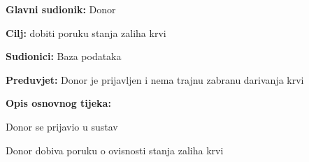 \noindent {}
					\begin{packed_item}
	
						\item \textbf{Glavni sudionik: }Donor
						\item \textbf{Cilj:} dobiti poruku stanja zaliha krvi
						\item \textbf{Sudionici:} Baza podataka
						\item \textbf{Preduvjet:} Donor je prijavljen i nema trajnu zabranu darivanja krvi
						\item \textbf{Opis osnovnog tijeka:}
						
						\item[] \begin{packed_enum}
	
							\item Donor se prijavio u sustav
							\item Donor dobiva poruku o ovisnosti stanja zaliha krvi
							
						\end{packed_enum}

					\end{packed_item}


